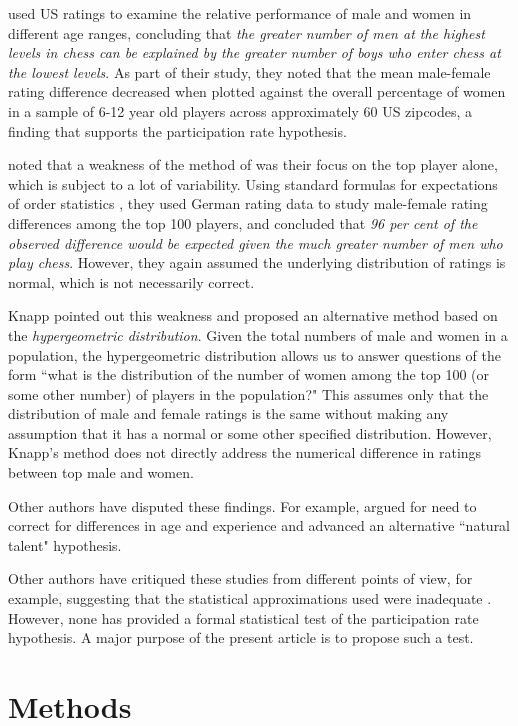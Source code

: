 \documentclass[9pt,twocolumn,twoside,lineno]{pnas-new}
\begin{document}
\cite{chabris2006sex} used US ratings to examine the relative performance of male and women in
different age ranges, concluding that \textit{the greater number of men at the highest levels in chess 
can be explained by the greater number of boys who enter chess at the lowest levels}. As part of their 
study, they noted that the mean male-female rating difference decreased when plotted against the overall percentage of women in a sample of 6-12 year old players across approximately 60 US zipcodes, 
a finding that supports the participation rate hypothesis.

\cite{bilalic2009best} noted that a weakness of the method of \cite{charness1996participation} was their
focus on the top player alone, which is subject to a lot of variability. Using standard formulas for
expectations of order statistics \cite{davidnagaraja}, they used German rating data to study male-female
rating differences among the top 100 players, and concluded that
\textit{96 per cent of the observed difference would be expected given the much greater number of men who play chess}. However, they again assumed the underlying distribution of ratings is normal, which is
not necessarily correct.

Knapp \cite{knapp2010prsb} pointed out this weakness and proposed an alternative method based on the \textit{hypergeometric distribution}. Given the total numbers of male and women in a population, the hypergeometric distribution allows us to answer questions of the form ``what is the distribution of the number of women among the top 100 (or some other number) of players in the population?"
This assumes only that the distribution of male and female ratings is the same without making any assumption that it has a normal or some other specified distribution. However, Knapp's method does not directly address the numerical difference in ratings between top male and women.

Other authors have disputed these findings. For example, \cite{howard2014jbs} argued for need to correct 
for differences in age and experience and advanced an alternative ``natural talent" hypothesis.

Other authors have critiqued these studies from different points of view, for example, suggesting
that the statistical approximations used were inadequate \cite{wiesend}.
However, none has provided a formal statistical test of the participation rate hypothesis. A major
purpose of the present article is to propose such a test.

\section*{Methods}
\end{document}
